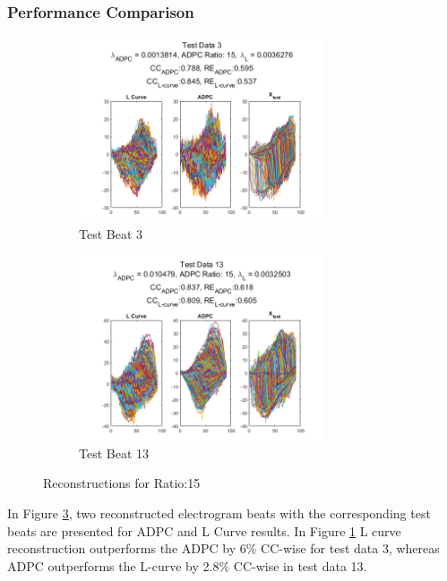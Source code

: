 \documentclass[draftcls, onecolumn, journal]{IEEEtran}
\begin{document}
\subsubsection{Performance Comparison}

\begin{figure}[h]
\centering
\begin{subfigure}[b]{0.45\textwidth}
\centering
\includegraphics[width=0.8\textwidth]{../images/recs1.png}
\caption{Test Beat 3}\label{subfig:rec1}
\end{subfigure}
\begin{subfigure}[b]{0.45\linewidth}
\centering
\includegraphics[width=0.8\textwidth]{../images/recs3.png}
\caption{Test Beat 13}\label{subfig:rec3}
\end{subfigure}
\caption{Reconstructions for Ratio:15}
\label{fig:recs_compare}
\end{figure}

In Figure \ref{fig:recs_compare}, two reconstructed electrogram beats with the corresponding test beats are presented for ADPC and L Curve results. In Figure \ref{subfig:rec1} L curve reconstruction outperforms the ADPC by 6\% CC-wise for test data 3, whereas ADPC outperforms the L-curve by 2.8\% CC-wise in test data 13. 
\end{document}
